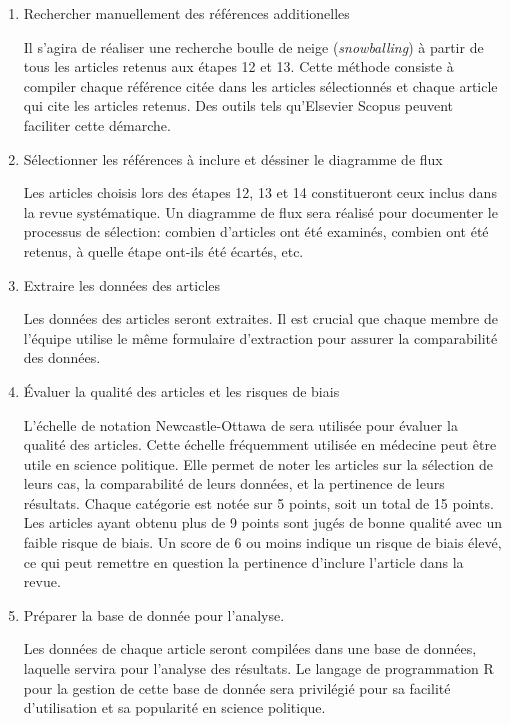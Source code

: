 \documentclass[
  letterpaper,
]{scrbook}
\begin{document}
\begin{enumerate}
  \item Rechercher manuellement des références additionelles
  
    Il s'agira de réaliser une recherche boulle de neige (\textit{snowballing}) à partir de tous les articles retenus aux étapes 12 et 13. Cette méthode consiste à compiler chaque référence citée dans les articles sélectionnés et chaque article qui cite les articles retenus. Des outils tels qu'Elsevier Scopus peuvent faciliter cette démarche.

  \item Sélectionner les références à inclure et déssiner le diagramme de flux
  
    Les articles choisis lors des étapes 12, 13 et 14 constitueront ceux inclus dans la revue systématique. Un diagramme de flux sera réalisé pour documenter le processus de sélection: combien d'articles ont été examinés, combien ont été retenus, à quelle étape ont-ils été écartés, etc.

  \item Extraire les données des articles
  
    Les données des articles seront extraites. Il est crucial que chaque membre de l'équipe utilise le même formulaire d'extraction pour assurer la comparabilité des données.

  \item Évaluer la qualité des articles et les risques de biais
  
    L'échelle de notation Newcastle-Ottawa de \textcite{wells_etal00} sera utilisée pour évaluer la qualité des articles. Cette échelle fréquemment utilisée en médecine peut être utile en science politique. Elle permet de noter les articles sur la sélection de leurs cas, la comparabilité de leurs données, et la pertinence de leurs résultats. Chaque catégorie est notée sur 5 points, soit un total de 15 points. Les articles ayant obtenu plus de 9 points sont jugés de bonne qualité avec un faible risque de biais. Un score de 6 ou moins indique un risque de biais élevé, ce qui peut remettre en question la pertinence d'inclure l'article dans la revue.

  \item Préparer la base de donnée pour l'analyse.
  
    Les données de chaque article seront compilées dans une base de données, laquelle servira pour l'analyse des résultats. Le langage de programmation R pour la gestion de cette base de donnée sera privilégié pour sa facilité d'utilisation et sa popularité en science politique.


\end{enumerate}
\end{document}

